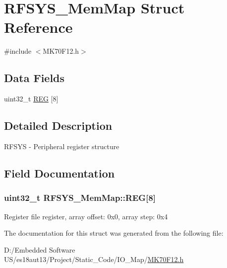 \hypertarget{struct_r_f_s_y_s___mem_map}{}\section{R\+F\+S\+Y\+S\+\_\+\+Mem\+Map Struct Reference}
\label{struct_r_f_s_y_s___mem_map}


{\ttfamily \#include $<$M\+K70\+F12.\+h$>$}

\subsection*{Data Fields}
\begin{DoxyCompactItemize}
\item 
uint32\+\_\+t \hyperlink{struct_r_f_s_y_s___mem_map_a9ecc7686e575e2e1570cf50aa3234276}{R\+E\+G} \mbox{[}8\mbox{]}
\end{DoxyCompactItemize}


\subsection{Detailed Description}
R\+F\+S\+Y\+S -\/ Peripheral register structure 

\subsection{Field Documentation}
\hypertarget{struct_r_f_s_y_s___mem_map_a9ecc7686e575e2e1570cf50aa3234276}{}
\subsubsection[{R\+E\+G}]{\setlength{\rightskip}{0pt plus 5cm}uint32\+\_\+t R\+F\+S\+Y\+S\+\_\+\+Mem\+Map\+::\+R\+E\+G\mbox{[}8\mbox{]}}\label{struct_r_f_s_y_s___mem_map_a9ecc7686e575e2e1570cf50aa3234276}
Register file register, array offset\+: 0x0, array step\+: 0x4 

The documentation for this struct was generated from the following file\+:\begin{DoxyCompactItemize}
\item 
D\+:/\+Embedded Software U\+S/es18aut13/\+Project/\+Static\+\_\+\+Code/\+I\+O\+\_\+\+Map/\hyperlink{_m_k70_f12_8h}{M\+K70\+F12.\+h}\end{DoxyCompactItemize}

